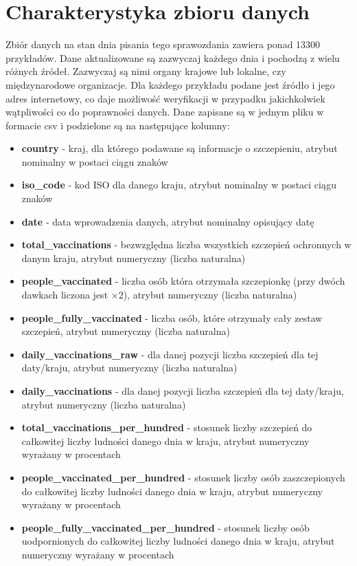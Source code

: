 \documentclass[12pt, oneside, openany]{article}
\begin{document}
\section{Charakterystyka zbioru danych}
Zbiór danych na stan dnia pisania tego sprawozdania zawiera ponad 13300 przykładów. Dane aktualizowane są zazwyczaj każdego dnia i pochodzą z wielu różnych źródeł. Zazwyczaj są nimi organy krajowe lub lokalne, czy międzynarodowe organizacje. Dla każdego przykładu podane jest źródło i jego adres internetowy, co daje możliwość weryfikacji w przypadku jakichkolwiek wątpliwości co do poprawności danych. Dane zapisane są w jednym pliku w formacie csv i podzielone są na następujące kolumny:
\begin{itemize}
\item \textbf{country} - kraj, dla którego podawane są informacje o szczepieniu, atrybut nominalny w postaci ciągu znaków
\item \textbf{iso\_code} - kod ISO dla danego kraju, atrybut nominalny w postaci ciągu znaków
\item \textbf{date} - data wprowadzenia danych, atrybut nominalny opisujący datę
\item \textbf{total\_vaccinations} - bezwzględna liczba wszystkich szczepień ochronnych w danym kraju, atrybut numeryczny (liczba naturalna)
\item \textbf{people\_vaccinated} - liczba osób która otrzymała szczepionkę (przy dwóch dawkach liczona jest $\times2$), atrybut numeryczny (liczba naturalna)
\item \textbf{people\_fully\_vaccinated} -  liczba osób, które otrzymały cały zestaw szczepień, atrybut numeryczny (liczba naturalna)
\item \textbf{daily\_vaccinations\_raw} - dla danej pozycji liczba szczepień dla tej daty/kraju, atrybut numeryczny (liczba naturalna)
\item \textbf{daily\_vaccinations} - dla danej pozycji liczba szczepień dla tej daty/kraju, atrybut numeryczny (liczba naturalna)
\item \textbf{total\_vaccinations\_per\_hundred} - stosunek liczby szczepień do całkowitej liczby ludności danego dnia w kraju, atrybut numeryczny wyrażany w procentach
\item \textbf{people\_vaccinated\_per\_hundred} - stosunek liczby osób zaszczepionych do całkowitej liczby ludności danego dnia w kraju, atrybut numeryczny wyrażany w procentach
\item \textbf{people\_fully\_vaccinated\_per\_hundred} - stosunek liczby osób uodpornionych do całkowitej liczby ludności danego dnia w kraju, atrybut numeryczny wyrażany w procentach

\end{itemize}
\end{document}
